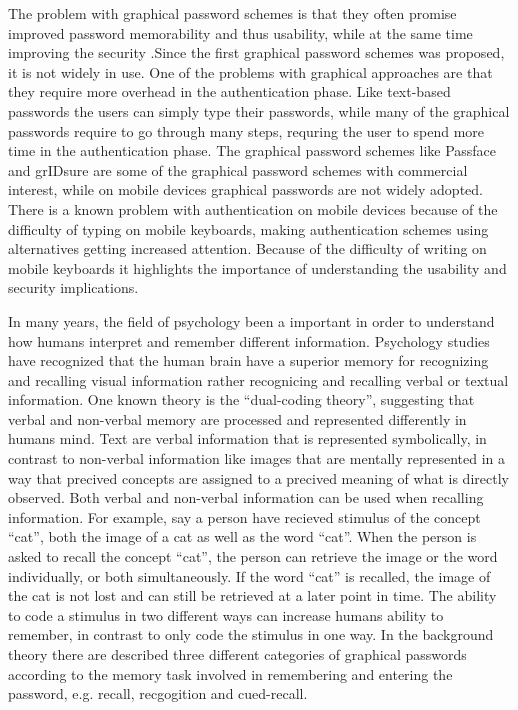     The problem with graphical password schemes is that they often promise improved password memorability and thus usability, while at the same time improving the security \cite{Biddle}.Since the first graphical password schemes was proposed, it is not widely in use. One of the problems with graphical approaches are that they require more overhead in the authentication phase. Like text-based passwords the users can simply type their passwords, while many of the graphical passwords require to go through many steps, requring the user to spend more time in the authentication phase. The graphical password schemes like Passface and grIDsure are some of the graphical password schemes with commercial interest, while on mobile devices graphical passwords are not widely adopted. There is a known problem with authentication on mobile devices because of the difficulty of typing on mobile keyboards, making authentication schemes using alternatives getting increased attention. Because of the difficulty of writing on mobile keyboards it highlights the importance of understanding the usability and security implications.

    In many years, the field of psychology been a important in order to understand how humans interpret and remember different information. Psychology studies have recognized that the human brain have a superior memory for recognizing and recalling visual information rather recognicing and recalling verbal or textual information. One known theory is the ``dual-coding theory'', suggesting that verbal and non-verbal memory are processed and represented differently in humans mind. Text are verbal information that is represented symbolically, in contrast to non-verbal information like images that are mentally represented in a way that precived concepts are assigned to a precived meaning of what is directly observed. Both verbal and non-verbal information can be used when recalling information. For example, say a person have recieved stimulus of the concept ``cat'', both the image of a cat as well as the word ``cat''. When the person is asked to recall the concept ``cat'', the person can retrieve the image or the word individually, or both simultaneously. 
    If the word ``cat'' is recalled, the image of the cat is not lost and can still be retrieved at a later point in time. The ability to code a stimulus in two different ways can increase humans ability to remember, in contrast to only code the stimulus in one way.
    In the background theory there are described three different categories of graphical passwords according to the memory task involved in remembering and entering the password, e.g. recall, recgogition and cued-recall. 

